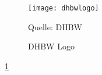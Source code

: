 
\begin{figure}[h]
	\begin{center}
	\texttt{[image: dhbwlogo]}
	\caption{DHBW Logo}
	Quelle: DHBW
	\label{fig: DHBW LOGO}
	\end{center}
\end{figure}

\ref{fig: DHBW LOGO}